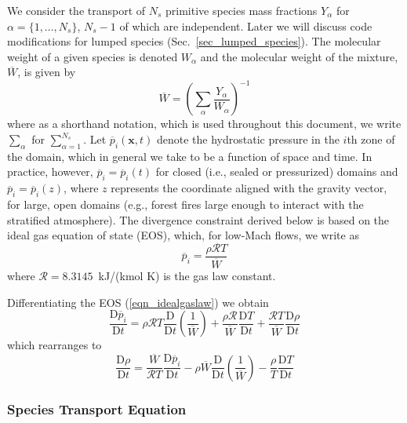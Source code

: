 We consider the transport of $N_s$ primitive species mass fractions $Y_\alpha$ for $\alpha = \{1,\ldots,N_s\}$, $N_s-1$ of which are independent.  Later we will discuss code modifications for lumped species (Sec.~\ref{sec_lumped_species}). The molecular weight of a given species is denoted $W_\alpha$ and the molecular weight of the mixture, $\overline{W}$, is given by
\begin{equation}
\label{eqn_mixmolewt}
\overline{W} = \left( \sum_{\alpha} \frac{Y_\alpha}{W_\alpha} \right)^{-1}
\end{equation}
where as a shorthand notation, which is used throughout this document, we write $\sum_\alpha$ for $\sum_{\alpha = 1}^{N_s}$. Let $\overline{p}_i(\mathbf{x},t)$ denote the hydrostatic pressure in the $i$th zone of the domain, which in general we take to be a function of space and time. In practice, however, $\overline{p}_i = \overline{p}_i(t)$ for closed (i.e., sealed or pressurized) domains and $\overline{p}_i = \overline{p}_i(z)$, where $z$ represents the coordinate aligned with the gravity vector, for large, open domains (e.g., forest fires large enough to interact with the stratified atmosphere). The divergence constraint derived below is based on the ideal gas equation of state (EOS), which, for low-Mach flows, we write as
\begin{equation}
\label{eqn_idealgaslaw}
\overline{p}_i = \frac{\rho \mathcal{R} T}{\overline{W}}
\end{equation}
where $\mathcal{R} = 8.3145$~kJ/(kmol K) is the gas law constant.

Differentiating the EOS (\ref{eqn_idealgaslaw}) we obtain
\begin{equation}
\label{eqn_DEOS1}
\frac{\mbox{D} \overline{p}_i}{\mbox{D} t} = \rho \mathcal{R} T \frac{\mbox{D}}{\mbox{D} t}\left(\frac{1}{\overline{W}}\right) +
\frac{\rho \mathcal{R}}{\overline{W}} \frac{\mbox{D} T}{\mbox{D} t} + \frac{\mathcal{R}T}{\overline{W}} \frac{\mbox{D} \rho}{\mbox{D} t}
\end{equation}
which rearranges to
\begin{equation}
\label{eqn_DEOS2}
\frac{\mbox{D} \rho}{\mbox{D} t} = \frac{\overline{W}}{\mathcal{R}T} \frac{\mbox{D}\overline{p}_i}{\mbox{D} t} -
\rho \overline{W} \frac{\mbox{D}}{\mbox{D} t}\left(\frac{1}{\overline{W}}\right) - \frac{\rho}{T} \frac{\mbox{D} T}{\mbox{D} t}
\end{equation}


\subsubsection{Species Transport Equation}
\label{species_transport}

